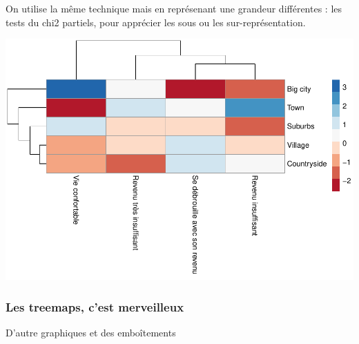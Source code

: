 \documentclass[
]{book}
\newenvironment{Shaded}{\begin{snugshade}}{\end{snugshade}}
\newcommand{\AttributeTok}[1]{\textcolor[rgb]{0.77,0.63,0.00}{#1}}
\newcommand{\DecValTok}[1]{\textcolor[rgb]{0.00,0.00,0.81}{#1}}
\newcommand{\FunctionTok}[1]{\textcolor[rgb]{0.00,0.00,0.00}{#1}}
\newcommand{\NormalTok}[1]{#1}
\newcommand{\OtherTok}[1]{\textcolor[rgb]{0.56,0.35,0.01}{#1}}
\newcommand{\SpecialCharTok}[1]{\textcolor[rgb]{0.00,0.00,0.00}{#1}}
\newcommand{\StringTok}[1]{\textcolor[rgb]{0.31,0.60,0.02}{#1}}
\begin{document}
On utilise la même technique mais en représenant une grandeur différentes : les tests du chi2 partiels, pour apprécier les sous ou les sur-représentation.

\begin{Shaded}
\end{Shaded}

\includegraphics{bookdown-demo_files/figure-latex/0430-1.pdf}

\hypertarget{les-treemaps-cest-merveilleux}{%
\subsubsection{Les treemaps, c'est merveilleux}\label{les-treemaps-cest-merveilleux}}

D'autre graphiques et des emboîtements
\end{document}
